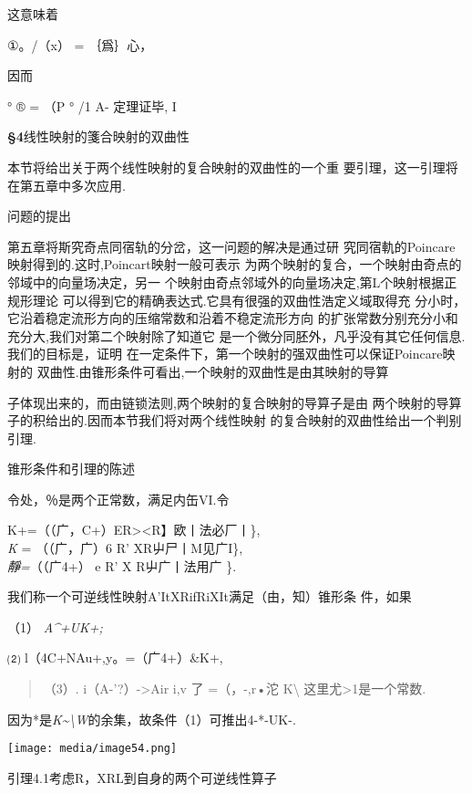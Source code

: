 \documentclass{article}
\begin{document}
这意味着

①。/（x） = ｛爲｝心，

因而

° ® = （P ° /1 A- 定理证毕, I

\protect\hypertarget{bookmark210}{}{}\textbf{§4}线性映射的箋合映射的双曲性

本节将给岀关于两个线性映射的复合映射的双曲性的一个重
要引理，这一引理将在第五章中多次应用.

问题的提出

第五章将斯究奇点同宿轨的分岔，这一问题的解决是通过研
究同宿軌的Poincare映射得到的.这时,Poincart映射一般可表示
为两个映射的复合，一个映射由奇点的邻域中的向量场决定，另一
个映射由奇点邻域外的向量场决定,第L个映射根据正规形理论
可以得到它的精确表达式.它具有很强的双曲性浩定义域取得充
分小时，它沿着稳定流形方向的压缩常数和沿着不稳定流形方向
的扩张常数分别充分小和充分大,我们对第二个映射除了知道它
是一个微分同胚外，凡乎没有其它任何信息.我们的目标是，证明
在一定条件下，第一个映射的强双曲性可以保证Poincare映射的
双曲性.由锥形条件可看出,一个映射的双曲性是由其映射的导算

子体现出来的，而由链锁法则,两个映射的复合映射的导算子是由
两个映射的导算子的积给出的.因而本节我们将对两个线性映射
的复合映射的双曲性给出一个判别引理.

锥形条件和引理的陈述

令处，％是两个正常数，满足内缶VI.令

K+=（（广，C+）ER\textbar{}\textgreater{}\textless{}R】\textbar{}欧丨法必\textbar{}厂丨\},\\
\emph{K} = （（广，广）6 R' XR屮尸丨M见广I\},\\
\emph{靜=}（（广4+） e R' X R屮广丨法用广\textbar{} \}.

我们称一个可逆线性映射A'ItXRifRiXIt满足（由，知）锥形条 件，如果

（1） \emph{A\^{}+UK+;}

⑵ l（4C+\textbar{}NA\textbar{}u+\textbar{},y。=（广4+）\&K+,

\begin{quote}
（3）. i（A-'?）-\textbar{}\textgreater{}Air i,v 了 =（，-,r•沱
K\textbackslash{} 这里尤\textgreater{}1是一个常数.
\end{quote}

因为*是\emph{K\textasciitilde{}\textbackslash{}W}的余集，故条件（1）可推出4-*-UK-.

\texttt{[image: media/image54.png]}

引理4.1考虑R，XRL到自身的两个可逆线性算子
\end{document}
